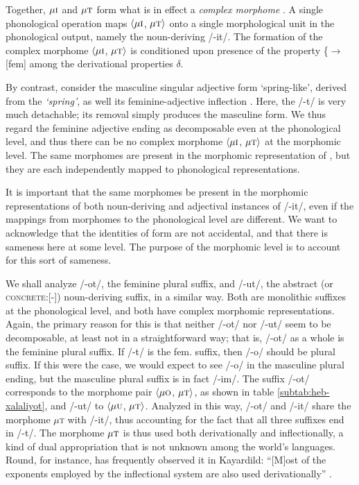 Together, $\mu\textsc{i}$ and $\mu\textsc{t}$ form what is in effect  
a \emph{complex morphome} \citep{round:2015, round:md:2016}. A single 
phonological operation maps $\langle \mu\textsc{i}$, $\mu\textsc{t} \rangle$ 
onto a single morphological unit in the phonological output, namely the 
noun-deriving /-it/. The formation of the complex morphome $\langle \mu\textsc{i}$, 
$\mu\textsc{t} \rangle$ is conditioned upon presence of the 
property \{$\to$[fem] among the derivational properties $\delta$.

  By contrast, consider the masculine singular adjective form \emph{} 
  `spring-like', derived from the \emph{ `spring'}, 
  as well its feminine-adjective inflection  \emph{}. Here, the /-t/ 
  is very much detachable; its removal simply produces the masculine form. We
  thus regard the feminine adjective ending as decomposable even at the 
  phonological level, and thus there can be no complex morphome $\langle \mu\textsc{i}$, 
  $\mu\textsc{t} \rangle$ at the morphomic level. The same morphomes are present in the 
  morphomic representation of \emph{}, but they are each 
  independently mapped to phonological representations.
  
  It is important that the same morphomes be present in the morphomic 
  representations of both noun-deriving and adjectival instances of /-it/, 
  even if the mappings from morphomes to the phonological level are different. We 
  want to acknowledge that the identities of form are not accidental, 
  and that there is sameness here at some level. The purpose of the 
  morphomic level is to account for
  this sort of sameness.
  
 We shall analyze /-ot/, the feminine plural suffix, and /-ut/, the abstract (or \textsc{concrete:}[-])
 noun-deriving suffix, in a similar way. Both are monolithic suffixes at the phonological
 level, and both have complex morphomic representations. Again, the primary reason for this
 is that neither /-ot/ nor /-ut/ seem to be decomposable, at least not in a straightforward
 way; that is, /-ot/ as a whole is the feminine plural suffix. If /-t/ is the fem. suffix, then
 /-o/ should be plural suffix. If this were the case, we would expect to see
 /-o/ in the masculine plural ending, but the masculine plural suffix is in fact /-im/. The suffix /-ot/
 corresponds to the morphome pair $\langle \mu\textsc{o}$, $\mu\textsc{t} \rangle$, 
 as shown in table \ref{subtab:heb-xalaliyot}, and /-ut/ to $\langle \mu\textsc{u}$, 
 $\mu\textsc{t} \rangle$. Analyzed in this way, /-ot/ and /-it/ share the morphome 
 $\mu$\textsc{t} with /-it/, thus accounting for the fact that all three suffixes end 
 in /-t/. The morphome $\mu\textsc{t}$ is thus used both derivationally and 
 inflectionally, a kind of dual appropriation that is not unknown among the world's languages. 
 Round, for instance, has frequently observed it in Kayardild: ``[M]ost of the exponents 
 employed by the inflectional system are also used derivationally'' \citep[][p. 13]{round:2015}.

